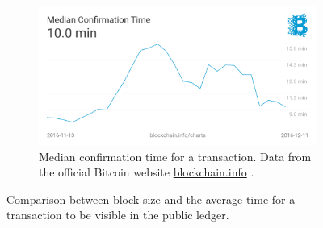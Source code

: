 \documentclass[USenglish]{uit-thesis}
\begin{document}
\begin{figure}[H]
	\begin{subfigure}{.7\textwidth}
			\centering
		\includegraphics[width=1\textwidth]{img/transaction_visibility_bitcoinwebsite}
		\caption{Median confirmation time for a transaction. Data from the official Bitcoin website
			\url{blockchain.info} \cite{bitcoin_blockchain}.}
		\label{fig:transaction_visibility_bitcoinwebsite}
	\end{subfigure}
	\caption{Comparison between block size and the average time for a transaction to be visible in the public ledger.}
	\label{fig:comparison_visibility_blockcreation}
\end{figure}
\end{document}
